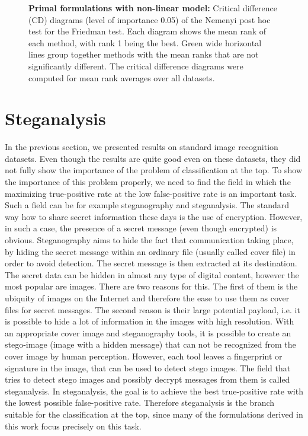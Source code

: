 \begin{figure}[!p]
  \centering
  
  \caption{\textbf{Primal formulations with non-linear model:} Critical difference (CD) diagrams (level of importance 0.05) of the Nemenyi post hoc test for the Friedman test. Each diagram shows the mean rank of each method, with rank 1 being the best. Green wide horizontal lines group together methods with the mean ranks that are not significantly different. The critical difference diagrams were computed for mean rank averages over all datasets.}
  \label{fig: critical diagrams primal NN}
\end{figure}

\newpage

\section{Steganalysis}

In the previous section, we presented results on standard image recognition datasets. Even though the results are quite good even on these datasets, they did not fully show the importance of the problem of classification at the top. To show the importance of this problem properly,  we need to find the field in which the maximizing true-positive rate at the low false-positive rate is an important task. Such a field can be for example steganography and steganalysis. The standard way how to share secret information these days is the use of encryption. However, in such a case, the presence of a secret message (even though encrypted) is obvious. Steganography aims to hide the fact that communication taking place, by hiding the secret message within an ordinary file (usually called cover file) in order to avoid detection. The secret message is then extracted at its destination. The secret data can be hidden in almost any type of digital content, however the most popular are images. There are two reasons for this. The first of them is the ubiquity of images on the Internet and therefore the ease to use them as cover files for secret messages. The second reason is their large potential payload, i.e. it is possible to hide a lot of information in the images with high resolution. With an appropriate cover image and steganography tools, it is possible to create an stego-image (image with a hidden message) that can not be recognized from the cover image by human perception. However, each tool leaves a fingerprint or signature in the image, that can be used to detect stego images. The field that tries to detect stego images and possibly decrypt messages from them is called steganalysis. In steganalysis, the goal is to achieve the best true-positive rate with the lowest possible false-positive rate. Therefore steganalysis is the branch suitable for the classification at the top, since many of the formulations derived in this work focus precisely on this task. \cite{morkel2005overview, silman2001steganography} 

